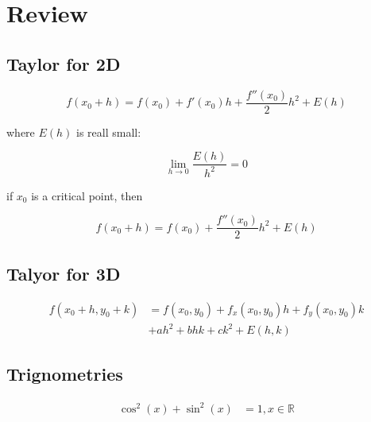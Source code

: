 \section{Review}

  \subsection{Taylor for 2D}

    \begin{equation}
      f\left( x_{0} + h \right)
        = f\left( x_{0} \right)
        + f'\left( x_{0} \right) h
        + \frac{f''\left( x_{0} \right)}{2} h^{2}
        + E\left( h \right)
    \end{equation}

    where $ E\left( h \right) $ is reall small:

    \begin{equation}
      \lim_{h \to 0} \frac{E\left( h \right)}{h^{2}} = 0
    \end{equation}

    if $ x_{0} $ is a critical point, then

    \begin{equation}
      f\left( x_{0} + h \right)
        = f\left( x_{0} \right)
        + \frac{f''\left( x_{0} \right)}{2} h^{2}
        + E\left( h \right)
    \end{equation}

  \subsection{Talyor for 3D}

    \begin{align*}
      f\left( x_{0} + h, y_{0} + k \right)
        &= f\left( x_{0}, y_{0} \right)
        + f_{x}\left( x_{0}, y_{0} \right) h
        + f_{y}\left( x_{0}, y_{0} \right) k \\
        &+ ah^{2} + bhk + ck^{2}
        + E\left( h, k \right)
    \end{align*}

  \subsection{Trignometries}

    \begin{align}
      \cos^{2}\left( x \right) + \sin^{2}\left( x \right) &= 1, x \in \mathbb{R}
    \end{align}


